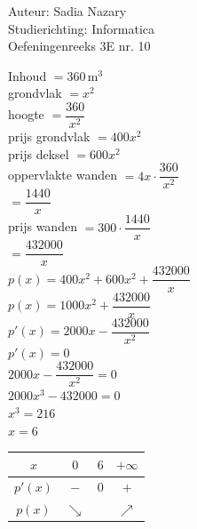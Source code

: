 \documentclass[a4paper]{article}
\begin{document}
  
\noindent \large Auteur: Sadia Nazary  \\
\noindent \large Studierichting: Informatica\\
\noindent \large Oefeningenreeks 3E nr. 10\\

\medskip

\normalsize

Inhoud $=360\,\text{m}^3$ \\

grondvlak $=x^2$ \\

hoogte $=\dfrac{360}{x^2}$ \\

prijs grondvlak $=400x^2$ \\

prijs deksel $=600x^2$ \\

oppervlakte wanden $=4x\cdot\dfrac{360}{x^2}$ \\

$=\dfrac{1440}{x}$ \\

prijs wanden $=300\cdot\dfrac{1440}{x}$ \\

$=\dfrac{432000}{x}$ \\

$p(x)=400x^2+600x^2+\dfrac{432000}{x}$ \\

$p(x)=1000x^2+\dfrac{432000}{x}$ \\

$p'(x)=2000x-\dfrac{432000}{x^2}$ \\

$p'(x)=0$ \\

$2000x-\dfrac{432000}{x^2}=0$ \\

$2000x^3-432000=0$ \\

$x^3=216$ \\

$x=6$ \\

\medskip

\begin{center}
\begin{tabular}{c|ccc}
$x$ & $0$ & $6$ & $+\infty$ \\
\hline
$p'(x)$ & $-$ & $0$ & $+$ \\
$p(x)$ & $\searrow$ & & $\nearrow$
\end{tabular}
\end{center}
\end{document}

